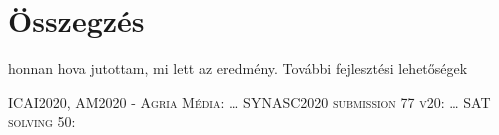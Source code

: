 \documentclass[
]{thesis-ekf}
\theoremstyle{definition}
\theoremstyle{remark}
\begin{document}
	
	\chapter*{Összegzés}
	honnan hova jutottam, mi lett az eredmény. További fejlesztési lehetőségek
	

	
	\begin{thebibliography}{2}
		\textsc{ICAI2020, AM2020 - Agria Média}: \dots
		\textsc{SYNASC2020 submission 77 v20}: \dots
		\textsc{SAT solving 50}:
	\end{thebibliography}
	
	
\end{document}
